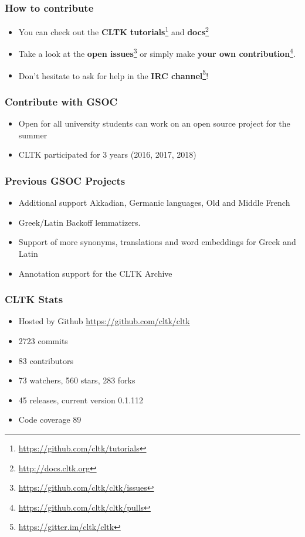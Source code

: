 \documentclass{beamer}
\begin{document}
\begin{frame}
\frametitle{How to contribute}
\begin{itemize}
    \item You can check out the \textbf{CLTK tutorials}\footnote{\href{https://github.com/cltk/tutorials}{https://github.com/cltk/tutorials}} and \textbf{docs}\footnote{\href{http://docs.cltk.org}{http://docs.cltk.org}}
    \item Take a look at the \textbf{open issues}\footnote{\href{https://github.com/cltk/cltk/issues}{https://github.com/cltk/cltk/issues}} or simply make \textbf{your own contribution}\footnote{\href{https://github.com/cltk/cltk/pulls}{https://github.com/cltk/cltk/pulls}}.
    \item Don’t hesitate to ask for help in the \textbf{IRC channel}\footnote{\href{https://gitter.im/cltk/cltk}{https://gitter.im/cltk/cltk}}!
\end{itemize}
\end{frame}

\begin{frame}
\frametitle{Contribute with GSOC}
\begin{itemize}
    \item Open for all university students
    \itemYou can work on an open source project for the summer
    \item CLTK participated for 3 years (2016, 2017, 2018)
\end{itemize}
\end{frame}

\begin{frame}
\frametitle{Previous GSOC Projects}
\begin{itemize}
    \item Additional support Akkadian, Germanic languages, Old and Middle French
    \item Greek/Latin Backoff lemmatizers.
    \item Support of more synonyms, translations and word embeddings for Greek and Latin
    \item Annotation support for the CLTK Archive
\end{itemize}
\end{frame}


\begin{frame}
\frametitle{CLTK Stats}
\begin{itemize}
\item Hosted by Github \href{https://github.com/cltk/cltk}{https://github.com/cltk/cltk}
\item 2723 commits
\item 83 contributors
\item 73 watchers, 560 stars, 283 forks
\item 45 releases, current version 0.1.112
\item Code coverage 89%
\end{itemize}


\end{frame}
\end{document}
